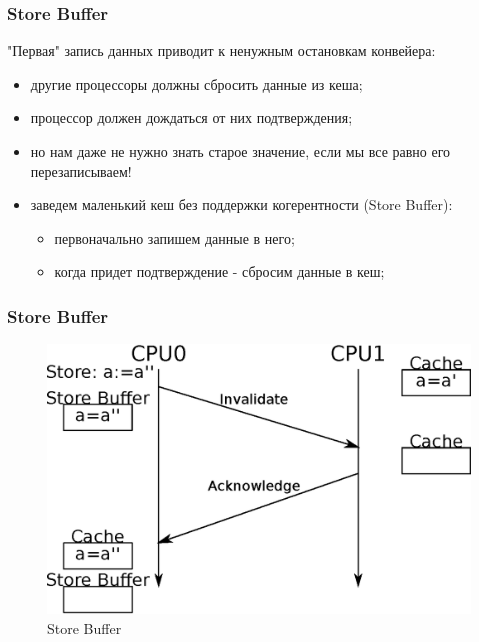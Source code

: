 \begin{frame}
\frametitle{Store Buffer}

"Первая" запись данных приводит к ненужным остановкам конвейера:
\begin{itemize}
  \item другие процессоры должны сбросить данные из кеша;
  \item процессор должен дождаться от них подтверждения;
  \item<2-> но нам даже не нужно знать старое значение, если мы все равно его
        перезаписываем!
  \item<3-> заведем маленький кеш без поддержки когерентности (Store Buffer):
        \begin{itemize}
          \item первоначально запишем данные в него;
          \item когда придет подтверждение - сбросим данные в кеш;
        \end{itemize}
\end{itemize}
\end{frame}

\begin{frame}
\frametitle{Store Buffer}

\begin{figure}
  \centering\includegraphics[width=.8\linewidth]{cache-store-buffer}
  \caption{Store Buffer}
\end{figure}
\end{frame}

